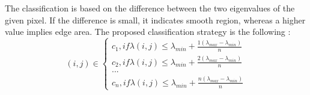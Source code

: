 \documentclass[draft,final]{vutinfth} %
\begin{document}
The classification is based on the difference between the two eigenvalues of the given pixel.
If the difference is small, it indicates smooth region, whereas a higher value implies edge area.
The proposed classification strategy is the following \cite{zeng2011region}:
\[
(i, j)\in \left\{
                \begin{array}{ll}
                  c_1, if \lambda(i,j) \leq \lambda_{min} + \frac{1(\lambda_{max} - \lambda_{min})}{n}\\
                  c_2, if \lambda(i,j) \leq \lambda_{min} + \frac{2(\lambda_{max} - \lambda_{min})}{n}\\
				... \\
                   c_n, if \lambda(i,j) \leq \lambda_{min} + \frac{n(\lambda_{max} - \lambda_{min})}{n}
                \end{array}
              \right.
\]
\end{document}
